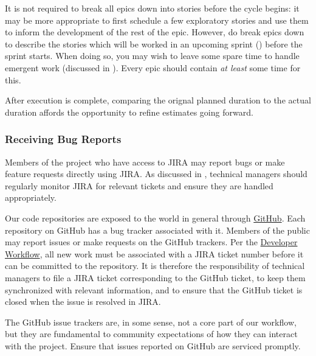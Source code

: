 It is not required to break all \glspl{epic} down into stories before the \gls{cycle} begins: it may be more appropriate to first schedule a few exploratory stories and use them to inform the development of the rest of the \gls{epic}.
However, do break \glspl{epic} down to describe the stories which will be worked in an upcoming sprint () before the sprint starts.
When doing so, you may wish to leave some spare time to handle emergent work (discussed in ).
Every \gls{epic} should contain \emph{at least} some time for this.

After execution is complete, comparing the orignal planned duration to the actual duration affords the opportunity to refine  estimates going forward.


\subsubsection{Receiving Bug Reports}
\label{receiving-bug-reports}

Members of the project who have access to \gls{JIRA} may report bugs or make feature requests directly using \gls{JIRA}.
As discussed in , technical managers should regularly monitor \gls{JIRA} for relevant tickets and ensure they are handled appropriately.

Our code repositories are exposed to the world in general through \href{https://github.com/lsst/}{GitHub}.
Each repository on GitHub has a bug tracker associated with it.
Members of the public may report issues or make requests on the GitHub trackers.
Per the \href{https://developer.lsst.io/processes/workflow.html}{Developer Workflow}, all new work must be associated with a \gls{JIRA} ticket number before it can be committed to the repository.
It is therefore the responsibility of technical managers to file a \gls{JIRA} ticket corresponding to the GitHub ticket, to keep them synchronized with relevant information, and to ensure that the GitHub ticket is closed when the issue is resolved in \gls{JIRA}.

The GitHub issue trackers are, in some sense, not a core part of our
workflow, but they are fundamental to community expectations of how they
can interact with the project. Ensure that issues reported on GitHub are
serviced promptly.

